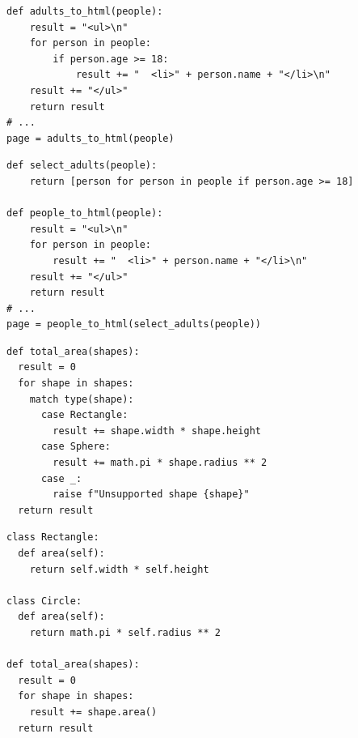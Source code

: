 \documentclass[calcdimensions,landscape,letterpaper]{powersem}
\newcommand{\thecurrentheading}{}
\newcommand{\heading}[1]{\renewcommand{\thecurrentheading}{#1}}
\begin{document}
\begin{slide}
  \heading{Single Responsibility - Before}
  \begin{center}
    \begin{verbatim}
def adults_to_html(people):
    result = "<ul>\n"
    for person in people:
        if person.age >= 18:
            result += "  <li>" + person.name + "</li>\n"
    result += "</ul>"
    return result
# ...
page = adults_to_html(people)
    \end{verbatim}
  \end{center}
\end{slide}

\begin{slide}
  \heading{Single Responsibility - After}
  \begin{center}
    \begin{verbatim}
def select_adults(people):
    return [person for person in people if person.age >= 18]

def people_to_html(people):
    result = "<ul>\n"
    for person in people:
        result += "  <li>" + person.name + "</li>\n"
    result += "</ul>"
    return result
# ...
page = people_to_html(select_adults(people))
    \end{verbatim}
  \end{center}
\end{slide}

\begin{slide}
  \heading{Open-Closed - Before}
  \begin{center}
    \begin{verbatim}
def total_area(shapes):
  result = 0
  for shape in shapes:
    match type(shape):
      case Rectangle:
        result += shape.width * shape.height
      case Sphere:
        result += math.pi * shape.radius ** 2
      case _:
        raise f"Unsupported shape {shape}"
  return result
    \end{verbatim}
  \end{center}
\end{slide}

\begin{slide}
  \heading{Open-Closed - After}
  \begin{center}
    \begin{verbatim}
class Rectangle:
  def area(self):
    return self.width * self.height

class Circle:
  def area(self):
    return math.pi * self.radius ** 2

def total_area(shapes):
  result = 0
  for shape in shapes:
    result += shape.area()
  return result
    \end{verbatim}
  \end{center}
\end{slide}
\end{document}

